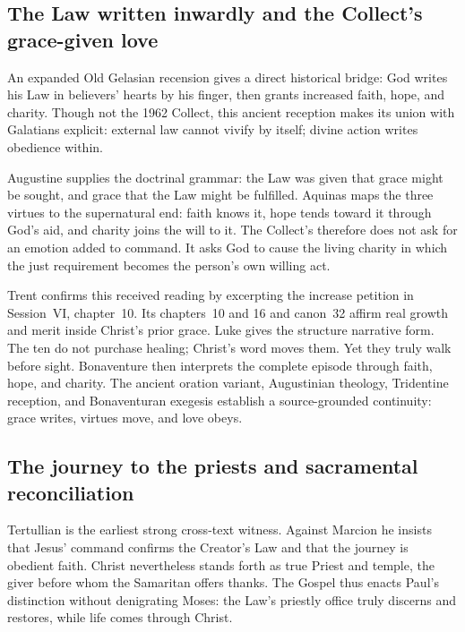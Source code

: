 \subsection*{The Law written inwardly and the Collect's grace-given love\enspace
  }

An expanded Old Gelasian recension gives a direct historical bridge: God
writes his Law in believers' hearts by his finger, then grants increased
faith, hope, and charity. Though not the 1962 Collect, this ancient reception
makes its union with Galatians explicit: external law cannot vivify by itself;
divine action writes obedience within.

Augustine supplies the doctrinal grammar: the Law was given that grace might
be sought, and grace that the Law might be fulfilled. Aquinas maps the three
virtues to the supernatural end: faith knows it, hope tends toward it through
God's aid, and charity joins the will to it. The Collect's  therefore does not ask for an emotion added to command. It asks God to
cause the living charity in which the just requirement becomes the person's
own willing act.

Trent confirms this received reading by excerpting the increase petition in
Session~VI, chapter~10. Its chapters~10 and 16 and canon~32 affirm real growth
and merit inside Christ's prior grace. Luke gives the structure narrative
form. The ten do not purchase healing; Christ's word moves them. Yet they truly
walk before sight. Bonaventure then interprets the complete episode through
faith, hope, and charity. The ancient oration variant, Augustinian theology,
Tridentine reception, and Bonaventuran exegesis establish a source-grounded
continuity: grace writes, virtues move, and love obeys.

\subsection*{The journey to the priests and sacramental reconciliation\enspace
  }

Tertullian is the earliest strong cross-text witness. Against Marcion he
insists that Jesus' command confirms the Creator's Law and that the journey is
obedient faith. Christ nevertheless stands forth as true Priest and temple,
the giver before whom the Samaritan offers thanks. The Gospel thus enacts
Paul's distinction without denigrating Moses: the Law's priestly office truly
discerns and restores, while life comes through Christ.

